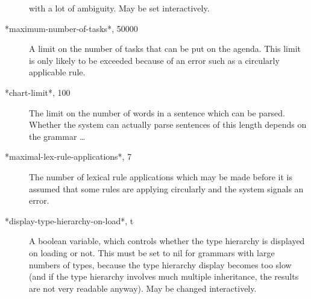 \documentclass[12pt]{report}
\begin{document}
\begin{description}
with a lot of ambiguity.  May be set interactively.
\item[*maximum-number-of-tasks*, 50000]
A limit on the number of tasks that can be put on the agenda.  This 
limit is only
likely to be exceeded because of an error such as a circularly
applicable rule.
\item[*chart-limit*, 100] The limit on the number of words in a sentence
which can be parsed.  Whether the system can actually parse sentences of
this length depends on the grammar \ldots
\item[*maximal-lex-rule-applications*, 7] 
The number of lexical rule applications which may be made
before it is assumed that some rules are applying circularly and the system
signals an error.
\item[*display-type-hierarchy-on-load*, t] A boolean variable, which
controls whether the type hierarchy is displayed on loading or not.
This must be set to nil for grammars with large numbers
of types, because the type hierarchy display becomes too slow (and if the
type hierarchy involves much multiple inheritance, the results are not
very readable anyway).  May be changed interactively.
\end{description}
\end{document}
